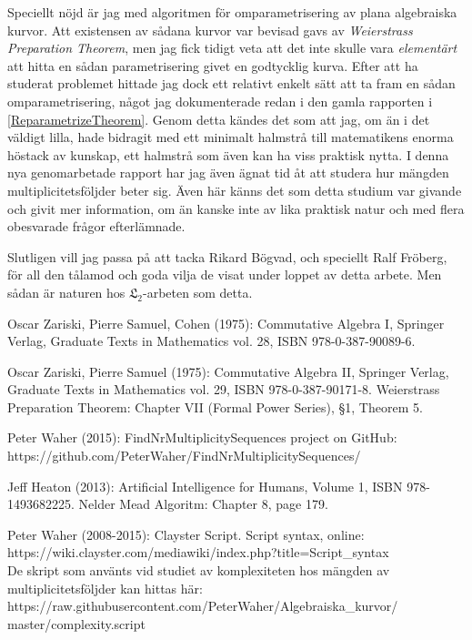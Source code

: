 \documentclass[twoside]{report}
\begin{document}
Speciellt nöjd är jag med algoritmen för omparametrisering av plana algebraiska kurvor. Att existensen av sådana kurvor var bevisad gavs av \emph{Weierstrass Preparation Theorem}, men jag fick tidigt veta att det inte skulle vara \emph{elementärt} att hitta en sådan parametrisering givet en godtycklig kurva. Efter att ha studerat problemet hittade jag dock ett relativt enkelt sätt att ta fram en sådan omparametrisering, något jag dokumenterade redan i den gamla rapporten i \ref{ReparametrizeTheorem}. Genom detta kändes det som att jag, om än i det väldigt lilla, hade bidragit med ett minimalt halmstrå till matematikens enorma höstack av kunskap, ett halmstrå som även kan ha viss praktisk nytta. I denna nya genomarbetade rapport har jag även ägnat tid åt att studera hur mängden multiplicitetsföljder beter sig. Även här känns det som detta studium var givande och givit mer information, om än kanske inte av lika praktisk natur och med flera obesvarade frågor efterlämnade.

Slutligen vill jag passa på att tacka Rikard Bögvad, och speciellt Ralf Fröberg, för all den tålamod och goda vilja de visat under loppet av detta arbete. Men sådan är naturen hos $\mathfrak{L}_2$-arbeten som detta.


\tableofcontents{}







\appendix{}






\begin{thebibliography}{99}
 Oscar Zariski, Pierre Samuel, Cohen (1975): Commutative Algebra I, Springer Verlag, Graduate Texts in Mathematics vol. 28, ISBN 978-0-387-90089-6.

 Oscar Zariski, Pierre Samuel (1975): Commutative Algebra II, Springer Verlag, Graduate Texts in Mathematics vol. 29, ISBN 978-0-387-90171-8. Weierstrass Preparation Theorem: Chapter VII (Formal Power Series), §1, Theorem 5.

 Peter Waher (2015): FindNrMultiplicitySequences project on GitHub: https://github.com/PeterWaher/FindNrMultiplicitySequences/

 Jeff Heaton (2013): Artificial Intelligence for Humans, Volume 1, ISBN 978-1493682225. Nelder Mead Algoritm: Chapter 8, page 179.

 Peter Waher (2008-2015): Clayster Script. Script syntax, online: https://wiki.clayster.com/mediawiki/index.php?title=Script\_syntax\\
De skript som använts vid studiet av komplexiteten hos mängden av multiplicitetsföljder kan hittas här:\\
https://raw.githubusercontent.com/PeterWaher/Algebraiska\_kurvor/\\
master/complexity.script

\end{thebibliography}
\end{document}
